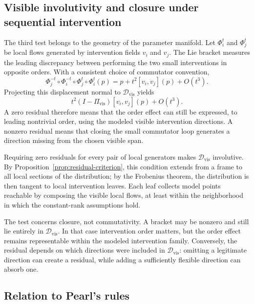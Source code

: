 \documentclass{article}
\theoremstyle{plain}
\theoremstyle{definition}
\theoremstyle{remark}
\newcommand{\Dvis}{\mathcal D_{\mathrm{vis}}}
\newcommand{\Pvis}{\Pi_{\mathrm{vis}}}
\begin{document}
\subsection{Visible involutivity and closure under sequential intervention}

The third test belongs to the geometry of the parameter manifold.  Let
\(\Phi_i^t\) and \(\Phi_j^t\) be local flows generated by intervention fields
\(v_i\) and \(v_j\).  The Lie bracket measures the leading discrepancy between
performing the two small interventions in opposite orders.  With a consistent
choice of commutator convention,
\[
  \Phi_j^{-t}\circ\Phi_i^{-t}\circ\Phi_j^t\circ\Phi_i^t(p)
  =
  p+t^2[v_i,v_j](p)+O(t^3).
\]
Projecting this displacement normal to \(\Dvis\) yields
\[
  t^2(I-\Pvis)[v_i,v_j](p)+O(t^3).
\]
A zero residual therefore means that the order effect can still be expressed,
to leading nontrivial order, using the modeled visible intervention directions.
A nonzero residual means that closing the small commutator loop generates a
direction missing from the chosen visible span.

Requiring zero residuals for every pair of local generators makes \(\Dvis\)
involutive.  By Proposition~\ref{prop:residual-criterion}, this condition extends from a
frame to all local sections of the distribution; by the Frobenius theorem, the
distribution is then tangent to local intervention leaves.  Each leaf collects
model points reachable by composing the visible local flows, at least within
the neighborhood in which the constant-rank assumptions hold.

The test concerns closure, not commutativity.  A bracket may be nonzero and
still lie entirely in \(\Dvis\).  In that case intervention order matters, but
the order effect remains representable within the modeled intervention family.
Conversely, the residual depends on which directions were included in
\(\Dvis\): omitting a legitimate direction can create a residual, while adding
a sufficiently flexible direction can absorb one.

\subsection{Relation to Pearl's rules}
\end{document}

